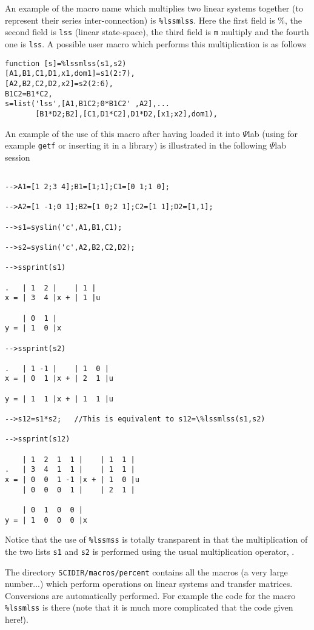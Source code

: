 	An example of the macro name which multiplies two
linear systems together (to represent their series inter-connection)
is {\tt \%lssmlss}.  Here the first field is \%, the second field is 
{\tt lss} (linear state-space), the third field is {\tt m} multiply
and the fourth one is {\tt lss}. A possible user macro which performs
this multiplication is as follows
\begin{verbatim}
function [s]=%lssmlss(s1,s2)
[A1,B1,C1,D1,x1,dom1]=s1(2:7),
[A2,B2,C2,D2,x2]=s2(2:6),
B1C2=B1*C2,
s=list('lss',[A1,B1C2;0*B1C2' ,A2],...
       [B1*D2;B2],[C1,D1*C2],D1*D2,[x1;x2],dom1),
\end{verbatim}
An example of the use of this macro after having loaded it into
$\Psi$lab (using for example {\tt getf} or inserting it in a library) 
is illustrated in the following $\Psi$lab session
\begin{verbatim}
 
-->A1=[1 2;3 4];B1=[1;1];C1=[0 1;1 0];
 
-->A2=[1 -1;0 1];B2=[1 0;2 1];C2=[1 1];D2=[1,1];
 
-->s1=syslin('c',A1,B1,C1);
 
-->s2=syslin('c',A2,B2,C2,D2);
 
-->ssprint(s1)
 
.   | 1  2 |    | 1 |    
x = | 3  4 |x + | 1 |u   
 
    | 0  1 |    
y = | 1  0 |x   
 
-->ssprint(s2)
 
.   | 1 -1 |    | 1  0 |    
x = | 0  1 |x + | 2  1 |u   
 
y = | 1  1 |x + | 1  1 |u   
 
-->s12=s1*s2;   //This is equivalent to s12=\%lssmlss(s1,s2)
 
-->ssprint(s12)
 
    | 1  2  1  1 |    | 1  1 |    
.   | 3  4  1  1 |    | 1  1 |    
x = | 0  0  1 -1 |x + | 1  0 |u   
    | 0  0  0  1 |    | 2  1 |    
 
    | 0  1  0  0 |    
y = | 1  0  0  0 |x   
\end{verbatim}
Notice that the use of {\tt \%lssmss} is totally transparent in
that the multiplication of the two lists {\tt s1} and {\tt s2}
is performed using the usual multiplication operator, {\tt *}.

The directory {\tt SCIDIR/macros/percent} contains all the macros
(a very large number...) which perform operations on linear systems
and transfer matrices. Conversions are automatically performed.
For example the code for the macro {\tt \%lssmlss} is there (note
that it is much more complicated that the code given here!).
